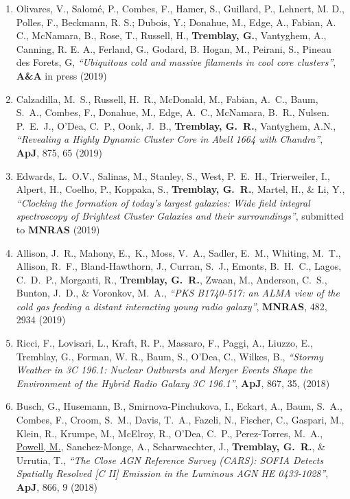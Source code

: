 \documentclass[11pt]{article}
\begin{document}
\begin{enumerate}[resume]
\item Olivares, V., Salomé, P., Combes, F., Hamer, S., Guillard, P., Lehnert, M. D., Polles, F., Beckmann, R. S.; Dubois, Y.; Donahue, M., Edge, A., Fabian, A. C., McNamara, B., Rose, T., Russell, H., \textbf{Tremblay, G.}, Vantyghem, A., Canning, R. E. A., Ferland, G., Godard, B. Hogan, M., Peirani, S., Pineau des Forets, G, \textit{``Ubiquitous cold and massive filaments in cool core clusters''}, \textbf{A\&A} in press (2019)



\item Calzadilla, M.~S., Russell, H.~R., McDonald, M., Fabian, A.~C., Baum, S.~A., Combes, F., Donahue, M., Edge, A.~C., McNamara, B.~R., Nulsen. P.~E.~J., O'Dea, C.~P., Oonk, J.~B., \textbf{Tremblay, G.~R.}, Vantyghem, A.N., \textit{``Revealing a Highly Dynamic Cluster Core in Abell 1664 with Chandra''}, \textbf{ApJ}, 875, 65 (2019)


\item Edwards, L.~O.V., Salinas, M., Stanley, S., West, P.~E.~H.,
Trierweiler, I., Alpert, H., Coelho, P., Koppaka, S., \textbf{Tremblay, G.~R.},
Martel, H., \& Li, Y., \textit{``Clocking the formation of today's largest galaxies: Wide field integral spectroscopy of Brightest Cluster Galaxies and their surroundings''},
submitted to \textbf{MNRAS} (2019)

\item Allison, J.~R., Mahony, E.,~K., Moss, V.~A., Sadler, E.~M., Whiting, M.~T.,
Allison, R.~F., Bland-Hawthorn, J., Curran, S.~J., Emonts, B.~H.~C., Lagos, C.~D.~P.,
Morganti, R., \textbf{Tremblay, G.~R.}, Zwaan, M., Anderson, C.~S.,
Bunton, J.~D., \& Voronkov, M.~A., \textit{``PKS B1740-517: an ALMA view of the
cold gas feeding a distant interacting young radio galaxy''}, \textbf{MNRAS}, 482,
2934 (2019)


\item Ricci, F., Lovisari, L., Kraft, R. P., Massaro, F., Paggi, A., Liuzzo, E., Tremblay, G., Forman, W. R., Baum, S., O'Dea, C., Wilkes, B., \textit{``Stormy Weather in 3C 196.1: Nuclear Outbursts and Merger Events Shape the Environment of the Hybrid Radio Galaxy 3C 196.1''}, \textbf{ApJ}, 867, 35, (2018)

\item Busch, G., Husemann, B., Smirnova-Pinchukova, I., Eckart, A.,
Baum, S.~A., Combes, F., Croom, S.~M., Davis, T.~A., Fazeli, N., Fischer, C.,
Gaspari, M., Klein, R., Krumpe, M., McElroy, R., O'Dea, C.~P., Perez-Torres, M.~A.,
\uline{Powell, M.}, Sanchez-Monge, A., Scharwaechter, J., \textbf{Tremblay, G.~R.},
\& Urrutia, T., \textit{``The Close AGN Reference Survey (CARS): SOFIA Detects
Spatially Resolved [C II] Emission in the Luminous AGN HE 0433-1028''}, \textbf{ApJ},
866, 9 (2018)



\end{enumerate}
\end{document}
